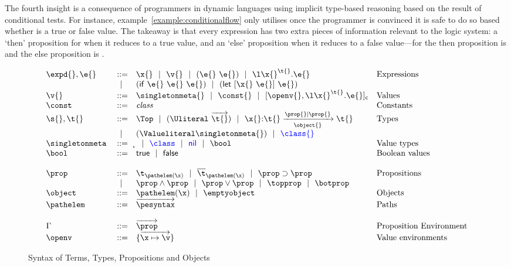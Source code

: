 The fourth insight is a consequence of
programmers in dynamic languages
using implicit type-based reasoning based on the result of
conditional tests.
For instance, example~\ref{example:conditionalflow}
only utilises  once
the programmer is convinced it is safe to do so based whether
is 
a true or false value. The takeaway is that every expression has
two extra pieces of information relevant to the logic system: a `then' proposition
for when it reduces to a true value, and an `else' proposition
when it reduces to a false value---for 
the then proposition is {\isprop{\NumberFull}{\x{}}} and 
the else proposition is {\notprop{\NumberFull}{\x{}}}.

\begin{figure}
  \footnotesize
$$
\begin{array}{lrll}
  \expd{}, \e{} &::=& \x{}
                      \alt \v{} 
                      \alt {\comb {\e{}} {\e{}}} 
                      \alt {\abs {\x{}} {\t{}} {\e{}}} &\mbox{Expressions} \\
                      &\alt& {\ifexp {\e{}} {\e{}} {\e{}}}
                      \alt {\letexp {\x{}} {\e{}} {\e{}}}\\
  \v{} &::=&          \singletonmeta{}
                      \alt {\const{}}
                      \alt {\closure {\openv{}} {\abs {\x{}} {\t{}} {\e{}}}}
                &\mbox{Values} \\
                \constantssyntax{}\\
  \s{}, \t{}    &::=& \Top 
                      \alt {\Unionsplice {\overrightarrow{\t{}}}}
                      \alt
                      {\ArrowOne {\x{}} {\t{}}
                                   {\t{}}
                                   {\filterset {\prop{}} {\prop{}}}
                                   {\object{}}}
                &\mbox{Types} \\
                      &\alt& {\Value \singletonmeta{}} 
                      \alt \trdiff{\class{}}\\
  \singletonallsyntax{}
                \\ \\
  \occurrencetypingsyntax{}\\
  \propenvsyntax{}\\
  \openvsyntax{}
\end{array}
$$
\caption{Syntax of Terms, Types, Propositions and Objects}
\label{main:figure:termsyntax}
\end{figure}


